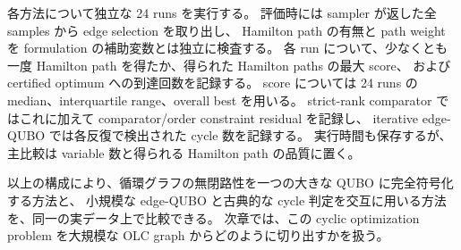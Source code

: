 各方法について独立な 24 runs を実行する。
評価時には sampler が返した全 samples から edge selection を取り出し、
Hamilton path の有無と path weight を formulation の補助変数とは独立に検査する。
各 run について、少なくとも一度 Hamilton path を得たか、得られた Hamilton paths の最大 score、
および certified optimum への到達回数を記録する。
score については 24 runs の median、interquartile range、overall best を用いる。
strict-rank comparator ではこれに加えて comparator/order constraint residual を記録し、
iterative edge-QUBO では各反復で検出された cycle 数を記録する。
実行時間も保存するが、主比較は variable 数と得られる Hamilton path の品質に置く。


以上の構成により、循環グラフの無閉路性を一つの大きな QUBO に完全符号化する方法と、
小規模な edge-QUBO と古典的な cycle 判定を交互に用いる方法を、同一の実データ上で比較できる。
次章では、この cyclic optimization problem を大規模な OLC graph からどのように切り出すかを扱う。
